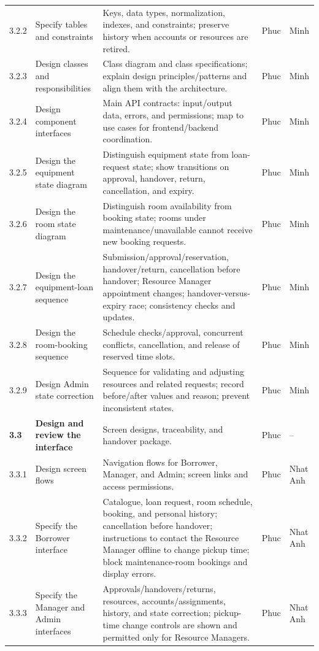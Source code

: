 \documentclass[11pt]{article}
\begin{document}
\begin{longtable}{@{}L{1.15cm}L{3.2cm}L{7.6cm}L{1.4cm}L{1.4cm}@{}}
3.2.2 & Specify tables and constraints & Keys, data types, normalization, indexes, and constraints; preserve history when accounts or resources are retired. & Phuc & Minh \\
3.2.3 & Design classes and responsibilities & Class diagram and class specifications; explain design principles/patterns and align them with the architecture. & Phuc & Minh \\
3.2.4 & Design component interfaces & Main API contracts: input/output data, errors, and permissions; map to use cases for frontend/backend coordination. & Phuc & Minh \\
3.2.5 & Design the equipment state diagram & Distinguish equipment state from loan-request state; show transitions on approval, handover, return, cancellation, and expiry. & Phuc & Minh \\
3.2.6 & Design the room state diagram & Distinguish room availability from booking state; rooms under maintenance/unavailable cannot receive new booking requests. & Phuc & Minh \\
3.2.7 & Design the equipment-loan sequence & Submission/approval/reservation, handover/return, cancellation before handover; Resource Manager appointment changes; handover-versus-expiry race; consistency checks and updates. & Phuc & Minh \\
3.2.8 & Design the room-booking sequence & Schedule checks/approval, concurrent conflicts, cancellation, and release of reserved time slots. & Phuc & Minh \\
3.2.9 & Design Admin state correction & Sequence for validating and adjusting resources and related requests; record before/after values and reason; prevent inconsistent states. & Phuc & Minh \\
\textbf{3.3} & \textbf{Design and review the interface} & Screen designs, traceability, and handover package. & Phuc & -- \\
3.3.1 & Design screen flows & Navigation flows for Borrower, Manager, and Admin; screen links and access permissions. & Phuc & Nhat Anh \\
3.3.2 & Specify the Borrower interface & Catalogue, loan request, room schedule, booking, and personal history; cancellation before handover; instructions to contact the Resource Manager offline to change pickup time; block maintenance-room bookings and display errors. & Phuc & Nhat Anh \\
3.3.3 & Specify the Manager and Admin interfaces & Approvals/handovers/returns, resources, accounts/assignments, history, and state correction; pickup-time change controls are shown and permitted only for Resource Managers. & Phuc & Nhat Anh \\

\end{longtable}
\end{document}

